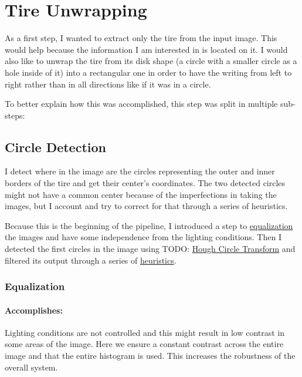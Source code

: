 \section{Tire Unwrapping}\label{sec:tire-unwrapping}

As a first step, I wanted to extract only the tire from the input image. This would help because the information I am interested in is located on it. I would also like to unwrap the tire from its disk shape (a circle with a smaller circle as a hole inside of it) into a rectangular one in order to have the writing from left to right rather than in all directions like if it was in a circle.

To better explain how this was accomplished, this step was split in multiple sub-steps:

\subsection{Circle Detection}

I detect where in the image are the circles representing the outer and inner borders of the tire and get their center’s coordinates. The two detected circles might not have a common center because of the imperfections in taking the images, but I account and try to correct for that through a series of heuristics.

Because this is the beginning of the pipeline, I introduced a step to \hyperref[subsubsec:equalization]{equalization} the images and have some independence from the lighting conditions. Then I detected the first circles in the image using TODO: \hyperref[subsubsec:hough_circles_transform]{Hough Circle Transform} and filtered its output through a series of \hyperref[subsubsec:circ_det_heuristics]{heuristics}.

\subsubsection{Equalization}
\label{subsubsec:equalization}

\paragraph*{Accomplishes:}\mbox{}\par
Lighting conditions are not controlled and this might result in low contrast in some areas of the image. Here we ensure a constant contrast across the entire image and that the entire histogram is used. This increases the robustness of the overall system.

